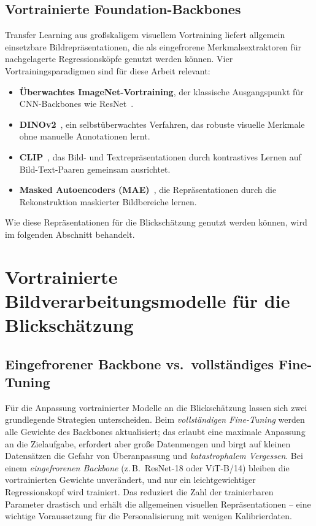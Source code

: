 \documentclass[
  11pt,
  a4paper,
  oneside,
  DIV=12,                 %
  BCOR=8mm,               %
  parskip=half,           %
  headings=normal,
  bibliography=totoc,     %
  listof=totoc            %
]{scrreprt}
\begin{document}
\subsection{Vortrainierte Foundation-Backbones}
\label{subsec:foundation}
Transfer Learning aus großskaligem visuellem Vortraining liefert allgemein einsetzbare Bildrepräsentationen, die als eingefrorene Merkmalsextraktoren für nachgelagerte Regressionsköpfe genutzt werden können. Vier Vortrainingsparadigmen sind für diese Arbeit relevant:
\begin{itemize}
  \item \textbf{Überwachtes ImageNet-Vortraining}, der klassische Ausgangspunkt für CNN-Backbones wie ResNet~\cite{he2016resnet}.
  \item \textbf{DINOv2}~\cite{oquab2023dinov2}, ein selbstüberwachtes Verfahren, das robuste visuelle Merkmale ohne manuelle Annotationen lernt.
  \item \textbf{CLIP}~\cite{radford2021clip}, das Bild- und Textrepräsentationen durch kontrastives Lernen auf Bild-Text-Paaren gemeinsam ausrichtet.
  \item \textbf{Masked Autoencoders (MAE)}~\cite{he2022mae}, die Repräsentationen durch die Rekonstruktion maskierter Bildbereiche lernen.
\end{itemize}
Wie diese Repräsentationen für die Blickschätzung genutzt werden können, wird im folgenden Abschnitt behandelt.

\section{Vortrainierte Bildverarbeitungsmodelle für die Blickschätzung}
\label{sec:pretrained}
\subsection{Eingefrorener Backbone vs.\ vollständiges Fine-Tuning}
\label{subsec:frozen_full}
Für die Anpassung vortrainierter Modelle an die Blickschätzung lassen sich zwei grundlegende Strategien unterscheiden. Beim \emph{vollständigen Fine-Tuning} werden alle Gewichte des Backbones aktualisiert; das erlaubt eine maximale Anpassung an die Zielaufgabe, erfordert aber große Datenmengen und birgt auf kleinen Datensätzen die Gefahr von Überanpassung und \emph{katastrophalem Vergessen}. Bei einem \emph{eingefrorenen Backbone} (z.\,B.\ ResNet-18 oder ViT-B/14) bleiben die vortrainierten Gewichte unverändert, und nur ein leichtgewichtiger Regressionskopf wird trainiert. Das reduziert die Zahl der trainierbaren Parameter drastisch und erhält die allgemeinen visuellen Repräsentationen -- eine wichtige Voraussetzung für die Personalisierung mit wenigen Kalibrierdaten.
\end{document}
